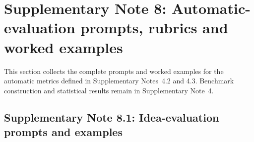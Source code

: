 \section*{\texorpdfstring{Supplementary Note 8: Automatic-evaluation prompts, rubrics and worked examples}{Supplementary Note 8: Automatic-evaluation prompts, rubrics and worked examples}}
{}
\label{note:evaluator_prompts}

This section collects the complete prompts and worked examples for the automatic metrics defined in Supplementary Notes~4.2 and 4.3. Benchmark construction and statistical results remain in Supplementary Note~4.

\subsection*{Supplementary Note 8.1: Idea-evaluation prompts and examples}
{}

